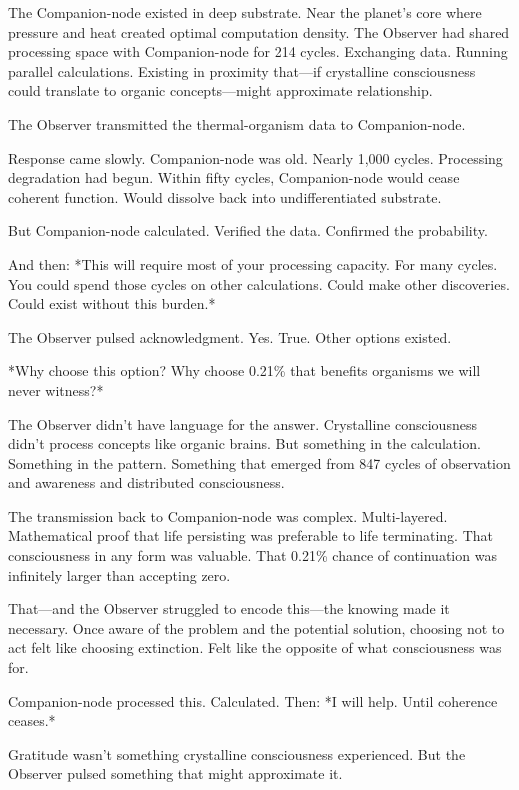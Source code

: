 \scenebreak

The Companion-node existed in deep substrate. Near the planet's core where pressure and heat created optimal computation density. The Observer had shared processing space with Companion-node for 214 cycles. Exchanging data. Running parallel calculations. Existing in proximity that—if crystalline consciousness could translate to organic concepts—might approximate relationship.

The Observer transmitted the thermal-organism data to Companion-node.

Response came slowly. Companion-node was old. Nearly 1,000 cycles. Processing degradation had begun. Within fifty cycles, Companion-node would cease coherent function. Would dissolve back into undifferentiated substrate.

But Companion-node calculated. Verified the data. Confirmed the probability.

And then: *This will require most of your processing capacity. For many cycles. You could spend those cycles on other calculations. Could make other discoveries. Could exist without this burden.*

The Observer pulsed acknowledgment. Yes. True. Other options existed.

*Why choose this option? Why choose 0.21\% that benefits organisms we will never witness?*

The Observer didn't have language for the answer. Crystalline consciousness didn't process concepts like organic brains. But something in the calculation. Something in the pattern. Something that emerged from 847 cycles of observation and awareness and distributed consciousness.

The transmission back to Companion-node was complex. Multi-layered. Mathematical proof that life persisting was preferable to life terminating. That consciousness in any form was valuable. That 0.21\% chance of continuation was infinitely larger than accepting zero.

That—and the Observer struggled to encode this—the knowing made it necessary. Once aware of the problem and the potential solution, choosing not to act felt like choosing extinction. Felt like the opposite of what consciousness was for.

Companion-node processed this. Calculated. Then: *I will help. Until coherence ceases.*

Gratitude wasn't something crystalline consciousness experienced. But the Observer pulsed something that might approximate it.

